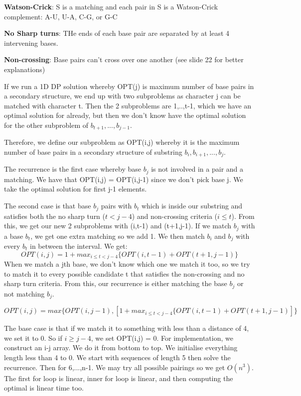\documentclass[11pt, oneside]{article}
\theoremstyle{definition}
\begin{document}
\textbf{Watson-Crick}: S is a matching and each pair in S is a Watson-Crick complement: A-U, U-A, C-G, or G-C

\textbf{No Sharp turns}: THe ends of each base pair are separated by at least 4 intervening bases.

\textbf{Non-crossing}: Base pairs can't cross over one another (see slide 22 for better explanations)

If we run a 1D DP solution whereby OPT(j) is maximum number of base pairs in a secondary structure, we end up with two subproblems as character j can be matched with character t. Then the 2 subproblems are 1,..,t-1, which we have an optimal solution for already, but then we don't know have the optimal solution for the other subproblem of $b_{t+1},...,b_{j-1}$.

Therefore, we define our subproblem as OPT(i,j) whereby it is the maximum number of base pairs in a secondary structure of substring $b_i,b_{i+1},...,b_j$.

The recurrence is the first case whereby base $b_j$ is not involved in a pair and a matching. We have that OPT(i,j) = OPT(i,j-1) since we don't pick base j. We take the optimal solution for first j-1 elements.

The second case is that base $b_j$ pairs with $b_t$ which is inside our substring and satisfies both the no sharp turn ($t <j-4$) and non-crossing criteria ($i \leq t$). From this, we get our new 2 subproblems with (i,t-1) and (t+1,j-1). If we match $b_j$ with a base $b_t$, we get one extra matching so we add 1. We then match $b_i$ and $b_j$ with every $b_t$ in between the interval. We get:
$$
OPT(i,j) = 1 + max_{i \leq t < j-4}\{OPT(i,t-1) + OPT(t+1,j-1)\}
$$
When we match a jth base, we don't know which one we match it too, so we try to match it to every possible candidate t that satisfies the non-crossing and no sharp turn criteria. From this, our recurrence is either matching the base $b_j$ or not matching $b_j$.

$$
OPT(i,j) = max\{OPT(i,j-1), [1 + max_{i \leq t < j-4}\{OPT(i,t-1) + OPT(t+1,j-1)]\}
$$

The base case is that if we match it to something with less than a distance of 4, we set it to 0. So if $i \geq j-4$, we set OPT(i,j) = 0. For implementation, we construct an i-j array. We do it from bottom to top. We initialise everything length less than 4 to 0. We start with sequences of length 5 then solve the recurrence. Then for 6,...,n-1. We may try all possible pairings so we get $O(n^3)$. The first for loop is linear, inner for loop is linear, and then computing the optimal is linear time too.
\end{document}
